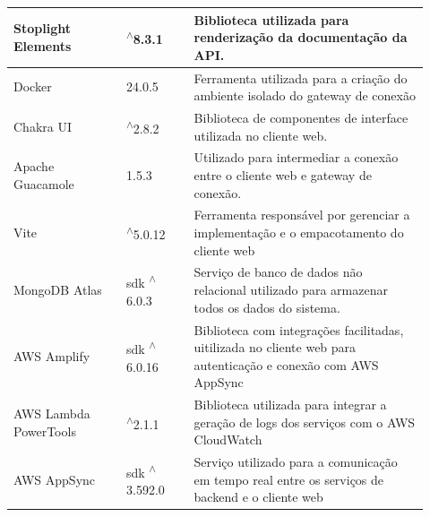 \begin{longtable}{p{0.25\linewidth} p{0.15\linewidth} p{0.525\linewidth}}
\hline

Stoplight Elements \citep{stoplightdocs} & \textsuperscript{$\wedge$}8.3.1 & Biblioteca utilizada para renderização da documentação da API. \\

\hline

Docker \citep{dockerdocs} & 24.0.5 & Ferramenta utilizada para a criação do ambiente isolado do gateway de conexão \\

\hline

Chakra UI \citep{chakrauidocs} & \textsuperscript{$\wedge$}2.8.2 & Biblioteca de componentes de interface utilizada no cliente web. \\

\hline

Apache Guacamole \citep{apacheguacamoledocs} & 1.5.3 & Utilizado para intermediar a conexão entre o cliente web e gateway de conexão. \\

\hline

Vite \citep{vitedocs} & \textsuperscript{$\wedge$}5.0.12 & Ferramenta responsável por gerenciar a implementação e o empacotamento do cliente web \\

\hline

MongoDB Atlas \citep{mongodbatlasdocs} & sdk \textsuperscript{$\wedge$}6.0.3 & Serviço de banco de dados não relacional utilizado para armazenar todos os dados do sistema. \\

\hline

AWS Amplify \citep{awsamplifydocs} & sdk \textsuperscript{$\wedge$}6.0.16 & Biblioteca com integrações facilitadas, uitilizada no cliente web para autenticação e conexão com AWS AppSync \\

\hline

AWS Lambda PowerTools \citep{awslambdapowertools} & \textsuperscript{$\wedge$}2.1.1 & Biblioteca utilizada para integrar a geração de logs dos serviços com o AWS CloudWatch \\

\hline

AWS AppSync \citep{awsappsync} & sdk \textsuperscript{$\wedge$}3.592.0 & Serviço utilizado para a comunicação em tempo real entre os serviços de backend e o cliente web \\

\hline


\end{longtable}
